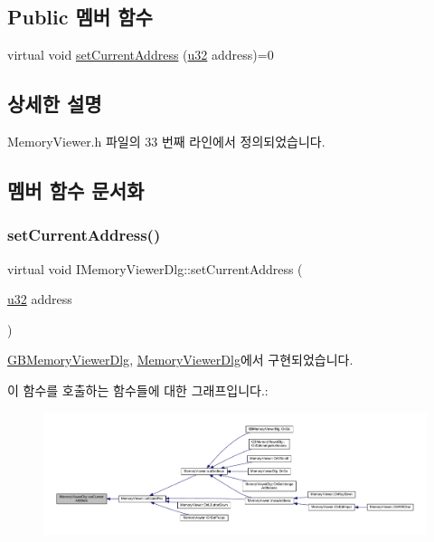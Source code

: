 \subsection*{Public 멤버 함수}
\begin{DoxyCompactItemize}
\item 
virtual void \mbox{\hyperlink{class_i_memory_viewer_dlg_a95cad5a86447abbc593b7154c110bb2c}{set\+Current\+Address}} (\mbox{\hyperlink{_system_8h_a10e94b422ef0c20dcdec20d31a1f5049}{u32}} address)=0
\end{DoxyCompactItemize}


\subsection{상세한 설명}


Memory\+Viewer.\+h 파일의 33 번째 라인에서 정의되었습니다.



\subsection{멤버 함수 문서화}
\mbox{\label{class_i_memory_viewer_dlg_a95cad5a86447abbc593b7154c110bb2c}} 
\subsubsection{\texorpdfstring{set\+Current\+Address()}{setCurrentAddress()}}
{\footnotesize\ttfamily virtual void I\+Memory\+Viewer\+Dlg\+::set\+Current\+Address (\begin{DoxyParamCaption}\item[{\mbox{\hyperlink{_system_8h_a10e94b422ef0c20dcdec20d31a1f5049}{u32}}}]{address }\end{DoxyParamCaption})\hspace{0.3cm}{\ttfamily [pure virtual]}}



\mbox{\hyperlink{class_g_b_memory_viewer_dlg_a9d6e6bf119f77c2b8843800ae5a6df7b}{G\+B\+Memory\+Viewer\+Dlg}}, \mbox{\hyperlink{class_memory_viewer_dlg_ac027e2a8dc226a7053068680050abd1f}{Memory\+Viewer\+Dlg}}에서 구현되었습니다.

이 함수를 호출하는 함수들에 대한 그래프입니다.\+:
\nopagebreak
\begin{figure}[H]
\begin{center}
\leavevmode
\includegraphics[width=350pt]{class_i_memory_viewer_dlg_a95cad5a86447abbc593b7154c110bb2c_icgraph}
\end{center}
\end{figure}


